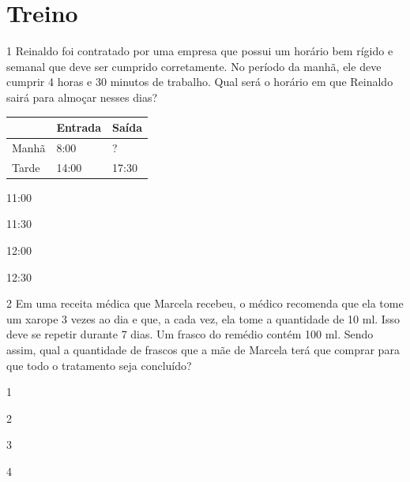 \section{Treino}

\num{1} Reinaldo foi contratado por uma empresa que possui um horário bem
rígido e semanal que deve ser cumprido corretamente. No período da manhã,
ele deve cumprir 4 horas e 30 minutos de trabalho. Qual será o horário em que
Reinaldo sairá para almoçar nesses dias?

\begin{longtable}[]{@{}lll@{}}
\toprule
& Entrada & Saída\tabularnewline
\midrule
\endhead
Manhã & 8:00 & ?\tabularnewline
Tarde & 14:00 & 17:30\tabularnewline
\bottomrule
\end{longtable}

\begin{minipage}{.5\textwidth}
\begin{escolha}
\item
  11:00
\item
  11:30
\item
  12:00
\item
  12:30
\end{escolha}
\end{minipage}

\num{2} Em uma receita médica que Marcela recebeu, o médico recomenda que ela tome um xarope 3
vezes ao dia e que, a cada vez, ela tome a quantidade de 10 ml. Isso deve se repetir durante 7
dias. Um frasco do remédio contém 100 ml. Sendo assim, qual a quantidade
de frascos que a mãe de Marcela terá que comprar para que todo o
tratamento seja concluído?

\begin{minipage}{.5\textwidth}
\begin{escolha}
\item
  1
\item
  2
\item
  3
\item
  4
\end{escolha}
\end{minipage}

